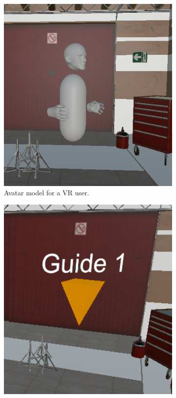 \begin{figure}[]
  \centering
  \begin{subfigure}[b]{0.3\textwidth}
    \includegraphics[width=1\textwidth]{fig/phase_1/vrMode.PNG}
    \caption{Avatar model for a VR user.}
    \label{fig:phase1VRmode}
  \end{subfigure}
  \hspace{2cm}
  \begin{subfigure}[b]{0.29\textwidth}
    \includegraphics[width=1\textwidth]{fig/phase_1/desktopMode.PNG}

\end{subfigure}
\end{figure}

